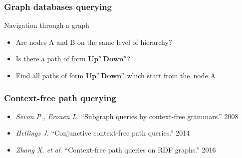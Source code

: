 \documentclass[xcolor=table]{beamer}
\begin{document}
\begin{frame} \frametitle{Graph databases querying}

  \begin{minipage}[m]{0.45\linewidth}
  \end{minipage}\hfill
  \begin{minipage}[m]{0.5\linewidth}
  Navigation through a graph
  \begin{itemize}
        \item Are nodes A and B on the same level of hierarchy?
        \item Is there a path of form $\textbf{Up}^n \, \textbf{Down}^n$?
        \item Find all paths of form $\textbf{Up}^n \, \textbf{Down}^n$ which start from the~node A
  \end{itemize}

  \end{minipage}


\end{frame}

\begin{frame}[fragile]
  \frametitle{Context-free path querying}
    \begin{itemize}
        \item \emph{Sevon P., Eronen L.} ``Subgraph queries by context-free grammars.'' 2008
        \item \emph{Hellings J.} ``Conjunctive context-free path queries.'' 2014
        \item \emph{Zhang X. et al.} ``Context-free path queries on RDF graphs.'' 2016
    \end{itemize}
\end{frame}
\end{document}
